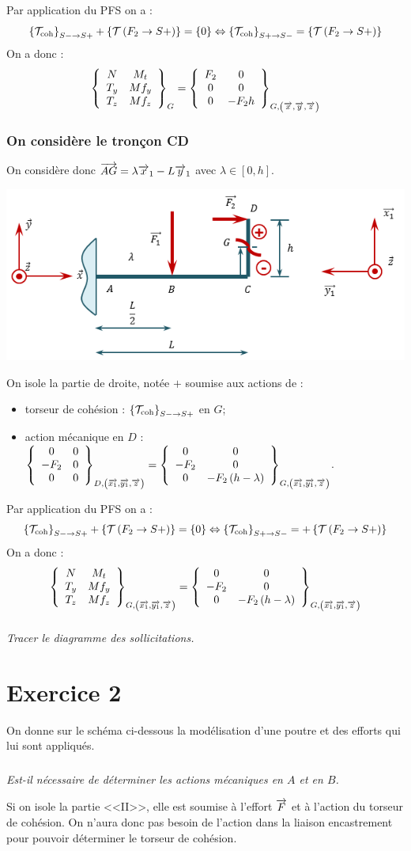 \documentclass[10pt,fleqn]{article} %
\begin{document}
\begin{multicols}{2}
\begin{corrige}
Par application du PFS on a : 
$$ \torseurscoh_{S-\rightarrow S+} +\torseurstat{T}{F_2}{S+} = \{0\} \Leftrightarrow \torseurscoh_{S+\rightarrow S-} =\torseurstat{T}{F_2}{S+}  $$
On a donc  :
$$
\torseurcol{N}{T_y}{T_z}{M_t}{Mf_y}{Mf_z}{G} = 
\torseurcol{F_2}{0}{0}{0}{0}{-F_2h}{G,\left( \vect{x},\vect{y},\vect{z} \right)}
$$
\subsubsection*{On considère le tronçon CD}
On considère donc $\vect{AG} = \lambda \vect{x}_1-L \vect{y}_1$  avec $\lambda\in \left[0,h\right]$.
\begin{center}
\includegraphics[width=.45\textwidth]{images/exo_08_corr_03}
\end{center}


On isole la partie de droite, notée $+$ soumise aux actions de :
\begin{itemize}[label=,font=\color{ocre}] 
\item torseur de cohésion : $\torseurscoh_{S-\rightarrow S+}$ en $G$;
\item action mécanique en $D$ : $\torseurcol{0}{-F_2}{0}{0}{0}{0}{D,\left( \vect{x_1},\vect{y_1},\vect{z} \right)}  =\torseurcol{0}{-F_2}{0}{0}{0}{-F_2\left(h-\lambda\right)}{G,\left( \vect{x_1},\vect{y_1},\vect{z} \right)} $.
\end{itemize}


Par application du PFS on a : 
$$ \torseurscoh_{S-\rightarrow S+} +\torseurstat{T}{F_2}{S+} = \{0\} \Leftrightarrow \torseurscoh_{S+\rightarrow S-} =+\torseurstat{T}{F_2}{S+}  $$
On a donc  :
$$
\torseurcol{N}{T_y}{T_z}{M_t}{Mf_y}{Mf_z}{G,\left( \vect{x_1},\vect{y_1},\vect{z} \right)} = 
\torseurcol{0}{-F_2}{0}{0}{0}{-F_2\left(h-\lambda\right)}{G,\left( \vect{x_1},\vect{y_1},\vect{z} \right)}
$$



\end{corrige}
\else 
\fi


\subparagraph{}
\textit{Tracer le diagramme des sollicitations.}



\section*{Exercice 2}
\setcounter{subparagraph}{0}
On donne sur le schéma ci-dessous la modélisation d'une poutre et des efforts qui lui sont appliqués.
\subparagraph{}
\textit{Est-il nécessaire de déterminer les actions mécaniques en $A$ et en $B$.}
\ifprof
\begin{corrige}
Si on isole la partie <<II>>, elle est soumise à l'effort $\vect{F}$ et à l'action du torseur de cohésion. On n'aura donc pas besoin de l'action dans la liaison encastrement pour pouvoir déterminer le torseur de cohésion. 
\end{corrige}
\else 
\fi



\end{multicols}
\end{document}
